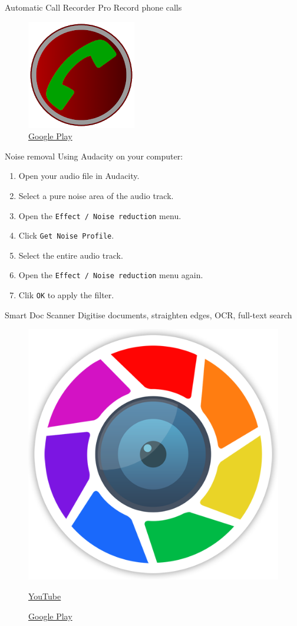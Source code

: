 \documentclass[serif,14pt,color=usenames,dvipsnames]{beamer}
\begin{document}
\begin{frame}{Automatic Call Recorder Pro}
  Record phone calls

  \begin{figure}
    \centering
    \includegraphics[width=0.25\linewidth]{imgs/acrp}\\
    \href{https://play.google.com/store/apps/details?id=com.appstar.callrecorderpro}{Google
  Play }
  \end{figure}

\end{frame}


\begin{frame}[fragile]{Noise removal}
  Using Audacity on your computer:
  \begin{enumerate}
    \item Open your audio file in Audacity.
    \item Select a pure noise area of the audio track.
    \item Open the \texttt{Effect / Noise reduction} menu.
    \item Click \texttt{Get Noise Profile}.
    \item Select the entire audio track.
    \item Open the \texttt{Effect / Noise reduction} menu again.
    \item Clik \texttt{OK} to apply the filter.
  \end{enumerate}
\end{frame}


\begin{frame}{Smart Doc Scanner}
  Digitise documents, straighten edges, OCR, full-text search

  \begin{figure}
  \centering
  \includegraphics[width=0.3\linewidth]{imgs/sds}

  \href{https://www.youtube.com/watch?v=zAcMvZpTeBo}{YouTube }

  \href{https://play.google.com/store/apps/details?id=com.mobilicy.docscanner}{Google
  Play }
  \end{figure}

\end{frame}
\end{document}
